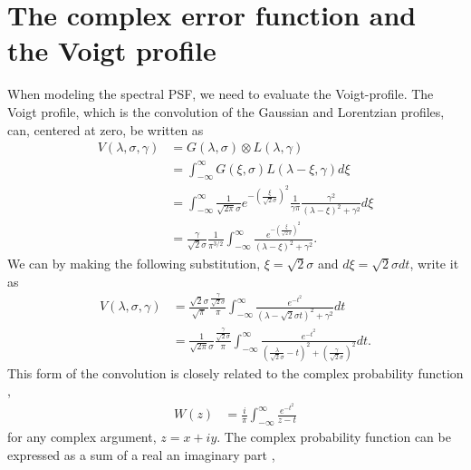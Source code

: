 \documentclass{aa}    %
\begin{document}
\section{The complex error function and the Voigt profile} \label{voigt}
When modeling the spectral PSF, we need to evaluate the Voigt-profile. The Voigt profile, which is the convolution of the Gaussian and Lorentzian profiles, can, centered at zero, be written as \citep{pagnini2010} 
\begin{equation} 
\begin{split}
V(\lambda,\sigma, \gamma)  
& = G(\lambda, \sigma)  \otimes L(\lambda, \gamma) \\
& = \int_{-\infty}^{\infty} G(\xi, \sigma) L(\lambda - \xi, \gamma) d\xi \\
& = \int_{-\infty}^{\infty} \frac{1}{\sqrt{2 \pi} \sigma} e^{- \left( \frac{\xi}{\sqrt{2} \sigma}  \right)^2 } \frac{1}{\gamma \pi} \frac{\gamma^2}{(\lambda - \xi)^2 + \gamma^2} d\xi \\
& = \frac{\gamma}{\sqrt{2} \sigma} \frac{1}{ \pi^{3/2}}   \int_{-\infty}^{\infty} \frac{e^{- \left( \frac{\xi}{\sqrt{2} \sigma}  \right)^2 }}{(\lambda - \xi)^2 + \gamma^2}.
\end{split}
\end{equation}
We can by making the following substitution, $\xi = \sqrt{2} \sigma$ and $d\xi = \sqrt{2} \sigma dt$, write it as
\begin{equation} 
\begin{split}
V(\lambda,\sigma, \gamma)  
& =  \frac{\sqrt{2} \sigma}{ \sqrt{{\pi}}} \frac{\frac{\gamma}{\sqrt{2} \sigma}}{\pi}  \int_{-\infty}^{\infty} \frac{e^{- t^2 }}{(\lambda - \sqrt{2} \sigma t)^2 + \gamma^2} dt \\
& = \frac{1}{\sqrt{2 \pi} \sigma}  \frac{\frac{\gamma}{\sqrt{2} \sigma}}{\pi}  \int_{-\infty}^{\infty} \frac{e^{- t^2 }}{\left(\frac{\lambda}{\sqrt{2} \sigma} -  t\right)^2 + \left(\frac{\gamma}{\sqrt{2} \sigma}\right)^2} dt.	
\end{split}
\end{equation}
This form of the convolution is closely related to the complex probability function \citep{letchworth2007, abrarov2015a},
\begin{equation} 
\begin{split}
W(z)  
& = \frac{i}{\pi} \int_{-\infty}^{\infty} \frac{e^{-t^2}}{z - t}  
\end{split}
\end{equation}
for any complex argument, $z = x + iy$. The complex probability function can be expressed as a sum of a real an imaginary part \citep{benner1995, abrarov2015b},
\end{document}
